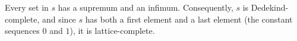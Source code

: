 Every set in $s$ has a supremum and an infimum. Consequently, $s$ is Dedekind-complete, and since $s$ has both a first element and a last element (the constant sequences $0$ and $1$), it is lattice-complete.
